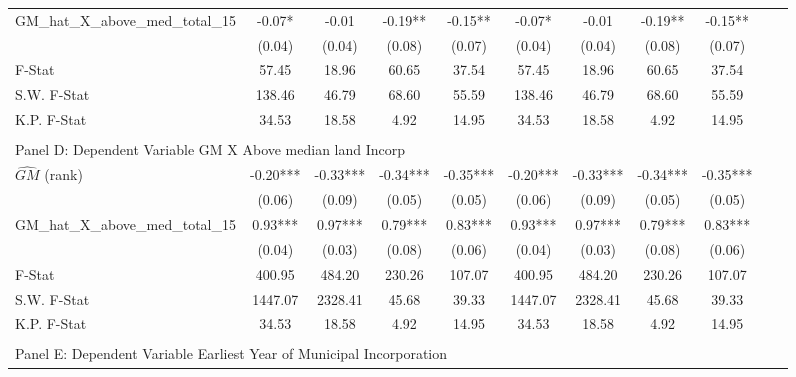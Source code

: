 \begin{table}[htbp]
\begin{threeparttable}
\begin{tabular}{l*{10}{c}}
\addlinespace
GM\_hat\_X\_above\_med\_total\_15&      -0.07*  &      -0.01   &      -0.19** &      -0.15** &      -0.07*  &      -0.01   &      -0.19** &      -0.15** \\
                &     (0.04)   &     (0.04)   &     (0.08)   &     (0.07)   &     (0.04)   &     (0.04)   &     (0.08)   &     (0.07)   \\
\midrule
F-Stat          &      57.45   &      18.96   &      60.65   &      37.54   &      57.45   &      18.96   &      60.65   &      37.54   \\
S.W. F-Stat     &     138.46   &      46.79   &      68.60   &      55.59   &     138.46   &      46.79   &      68.60   &      55.59   \\
K.P. F-Stat     &      34.53   &      18.58   &       4.92   &      14.95   &      34.53   &      18.58   &       4.92   &      14.95   \\
\cmidrule[\heavyrulewidth](lr){1-9} \\ \cmidrule[\heavyrulewidth](lr){1-9}
\multicolumn{8}{l}{Panel D: Dependent Variable GM X Above median land Incorp}\\
\cmidrule(lr){1-9}
$\hat{GM}$ (rank)&      -0.20***&      -0.33***&      -0.34***&      -0.35***&      -0.20***&      -0.33***&      -0.34***&      -0.35***\\
                &     (0.06)   &     (0.09)   &     (0.05)   &     (0.05)   &     (0.06)   &     (0.09)   &     (0.05)   &     (0.05)   \\
\addlinespace
GM\_hat\_X\_above\_med\_total\_15&       0.93***&       0.97***&       0.79***&       0.83***&       0.93***&       0.97***&       0.79***&       0.83***\\
                &     (0.04)   &     (0.03)   &     (0.08)   &     (0.06)   &     (0.04)   &     (0.03)   &     (0.08)   &     (0.06)   \\
\midrule
F-Stat          &     400.95   &     484.20   &     230.26   &     107.07   &     400.95   &     484.20   &     230.26   &     107.07   \\
S.W. F-Stat     &    1447.07   &    2328.41   &      45.68   &      39.33   &    1447.07   &    2328.41   &      45.68   &      39.33   \\
K.P. F-Stat     &      34.53   &      18.58   &       4.92   &      14.95   &      34.53   &      18.58   &       4.92   &      14.95   \\
\cmidrule[\heavyrulewidth](lr){1-9} \\ \cmidrule[\heavyrulewidth](lr){1-9}
\multicolumn{8}{l}{Panel E: Dependent Variable Earliest Year of Municipal Incorporation}\\

\end{tabular}
\end{threeparttable}
\end{table}

